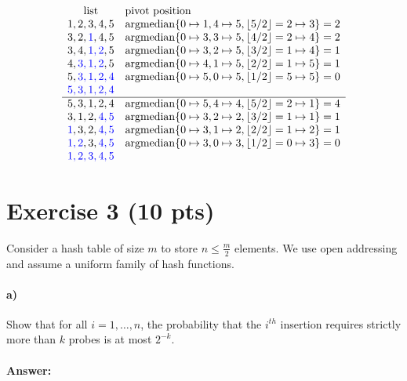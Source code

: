 \documentclass[a4paper]{article}
\newcommand*{\floor}[1]{\left\lfloor{#1}\right\rfloor}
\begin{document}
	\[
		\begin{array}{cl}
		\text{list} & \text{pivot position} \\
		1, 2, 3, 4, 5	&\argmedian\set{ 0\mapsto 1, 4\mapsto 5, \floor{5/2}=2\mapsto 3} = 2 \\
		3, 2, \USED{1}, 4, 5	&\argmedian\set{ 0\mapsto 3, 3\mapsto 5, \floor{4/2}=2\mapsto 4} = 2 \\
		3, 4, \USED{1, 2}, 5	&\argmedian\set{ 0\mapsto 3, 2\mapsto 5, \floor{3/2}=1\mapsto 4} = 1 \\
		4, \USED{3, 1, 2}, 5	&\argmedian\set{ 0\mapsto 4, 1\mapsto 5, \floor{2/2}=1\mapsto 5} = 1 \\
		5, \USED{3, 1, 2, 4}	&\argmedian\set{ 0\mapsto 5, 0\mapsto 5, \floor{1/2}=5\mapsto 5} = 0 \\
		\USED{5, 3, 1, 2, 4} \\\hline
		5, 3, 1, 2, 4	&\argmedian\set{ 0\mapsto 5, 4 \mapsto 4, \floor{5/2}=2\mapsto 1} = 4 \\
		3, 1, 2, \USED{4, 5}	&\argmedian\set{0 \mapsto 3, 2 \mapsto 2, \floor{3/2}=1 \mapsto 1} = 1 \\
		\USED{1}, 3, 2, \USED{4, 5} & \argmedian\set{0 \mapsto 3, 1 \mapsto 2, \floor{2/2}=1 \mapsto 2} = 1 \\
		\USED{1, 2}, 3, \USED{4, 5} & \argmedian\set{0 \mapsto 3, 0 \mapsto 3, \floor{1/2}=0 \mapsto 3} = 0 \\
		\USED{1, 2, 3, 4, 5}
		\end{array}
	\]


\section{Exercise 3 (10 pts)}

\noindent Consider a hash table of size $m$ to store $n \le  \frac{m}{2}$ elements. We use open addressing and assume a uniform family of hash functions.

\paragraph{a)} Show that for all $i = 1, \ldots, n$, the probability that the $i^{th}$ insertion requires strictly more than $k$ probes is at most $2^{-k}$.

\paragraph{Answer:}
\end{document}
